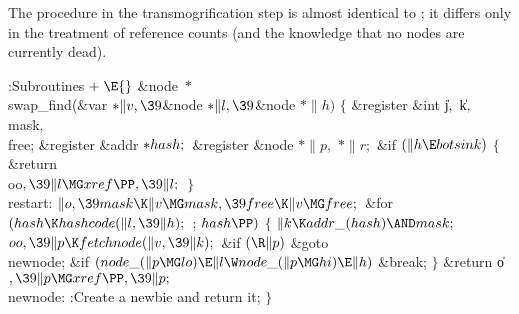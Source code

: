 The  procedure in the transmogrification step is
almost identical to ; it differs only in the treatment
of reference counts (and the knowledge that no nodes are currently dead).

\Y\B\4:Subroutines\X${}\mathrel+\E{}$\6
\&{node} ${}{*}{}$\\{swap\_find}(\&{var} ${}{*}\|v,\39{}$\&{node} ${}{*}\|l,%
\39{}$\&{node} ${}{*}\|h){}$\1\1\2\2\6
${}\{{}$\1\6
\&{register} \&{int} \|j${},{}$ \|k${},{}$ \\{mask}${},{}$ \\{free};\6
\&{register} \&{addr} ${}{*}\\{hash};{}$\6
\&{register} \&{node} ${}{*}\|p,{}$ ${}{*}\|r;{}$\7
\&{if} ${}(\|h\E\\{botsink}){}$\5
${}\{{}$\1\6
\&{return} \\{oo}${},\39\|l\MG\\{xref}\PP,\39\|l;{}$\6
\4${}\}{}$\2\6
\4\\{restart}:\5
${}\|o,\39\\{mask}\K\|v\MG\\{mask},\39\\{free}\K\|v\MG\\{free};{}$\6
\&{for} ${}(\\{hash}\K\\{hashcode}(\|l,\39\|h);{}$  ; ${}\\{hash}\PP){}$\5
${}\{{}$\1\6
${}\|k\K\\{addr\_}(\\{hash})\AND\\{mask};{}$\6
${}\\{oo},\39\|p\K\\{fetchnode}(\|v,\39\|k);{}$\6
\&{if} ${}(\R\|p){}$\1\5
\&{goto} \\{newnode};\2\6
\&{if} ${}(\\{node\_}(\|p\MG\\{lo})\E\|l\W\\{node\_}(\|p\MG\\{hi})\E\|h){}$\1\5
\&{break};\2\6
\4${}\}{}$\2\6
\&{return} \|o${},\39\|p\MG\\{xref}\PP,\39\|p;{}$\6
\4\\{newnode}:\5
:Create a newbie and return it\X;\6
\4${}\}{}$\2\par
\fi


